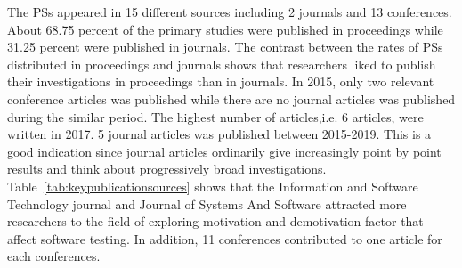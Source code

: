 \documentclass[conference, compsoc, twoside]{IEEEtran}
\begin{document}
The PSs appeared in 15 different sources including 2 journals and 13 conferences. About 68.75 percent of the primary studies were published in proceedings while 31.25 percent were published in journals. 
The contrast between the rates of PSs distributed in proceedings and journals shows that researchers liked to publish their investigations in proceedings than in journals.
In 2015, only two relevant conference articles was published while there are no journal articles was published during the similar period.
The highest number of articles,i.e. 6 articles, were written in 2017.
5 journal articles was published between 2015-2019.
This is a good indication since journal articles ordinarily give increasingly point by point results and think about progressively broad investigations.
Table~\ref{tab:keypublicationsources} shows that the Information and Software Technology journal and Journal of Systems And Software attracted more researchers to the field of exploring motivation and demotivation factor that affect software testing. In addition, 11 conferences contributed to one article for each conferences.
\end{document}
